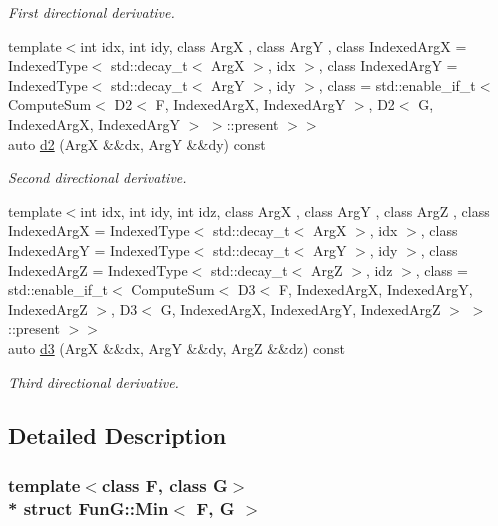 \begin{DoxyCompactItemize}
\begin{DoxyCompactList}\small\item\em First directional derivative. \end{DoxyCompactList}\item 
{\footnotesize template$<$int idx, int idy, class ArgX , class ArgY , class Indexed\+ArgX  = Indexed\+Type$<$ std\+::decay\+\_\+t$<$ Arg\+X $>$, idx $>$, class Indexed\+ArgY  = Indexed\+Type$<$ std\+::decay\+\_\+t$<$ Arg\+Y $>$, idy $>$, class  = std\+::enable\+\_\+if\+\_\+t$<$                       Compute\+Sum$<$ D2$<$ F, Indexed\+Arg\+X, Indexed\+Arg\+Y $>$,                                   D2$<$ G, Indexed\+Arg\+X, Indexed\+Arg\+Y $>$ $>$\+::present $>$$>$ }\\auto \hyperlink{structFunG_1_1Min_a4ba4840e81aa0a3741dee6aa2dcfee1b}{d2} (ArgX \&\&dx, ArgY \&\&dy) const 
\begin{DoxyCompactList}\small\item\em Second directional derivative. \end{DoxyCompactList}\item 
{\footnotesize template$<$int idx, int idy, int idz, class ArgX , class ArgY , class ArgZ , class Indexed\+ArgX  = Indexed\+Type$<$ std\+::decay\+\_\+t$<$ Arg\+X $>$, idx $>$, class Indexed\+ArgY  = Indexed\+Type$<$ std\+::decay\+\_\+t$<$ Arg\+Y $>$, idy $>$, class Indexed\+ArgZ  = Indexed\+Type$<$ std\+::decay\+\_\+t$<$ Arg\+Z $>$, idz $>$, class  = std\+::enable\+\_\+if\+\_\+t$<$                       Compute\+Sum$<$ D3$<$ F, Indexed\+Arg\+X, Indexed\+Arg\+Y, Indexed\+Arg\+Z $>$,                                   D3$<$ G, Indexed\+Arg\+X, Indexed\+Arg\+Y, Indexed\+Arg\+Z $>$ $>$\+::present $>$$>$ }\\auto \hyperlink{structFunG_1_1Min_aea623fee862f72635b83f3fdc45a09d5}{d3} (ArgX \&\&dx, ArgY \&\&dy, ArgZ \&\&dz) const 
\begin{DoxyCompactList}\small\item\em Third directional derivative. \end{DoxyCompactList}\end{DoxyCompactItemize}


\subsection{Detailed Description}
\subsubsection*{template$<$class F, class G$>$\\*
struct Fun\+G\+::\+Min$<$ F, G $>$}

